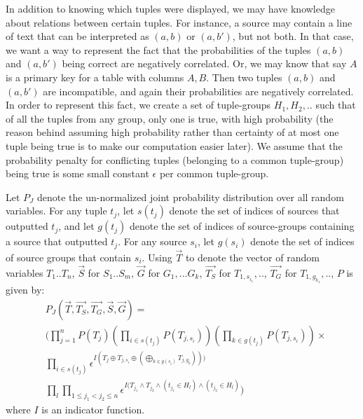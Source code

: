 \documentclass{sig-alternate}
\newcounter{prob}
\begin{document}
In addition to knowing which tuples were displayed, we may have knowledge about relations between certain tuples. For instance, a source may contain a line of text that can be interpreted as $(a,b)$ or $(a, b')$, but not both. In that case, we want a way to represent the fact that the probabilities of the tuples $(a, b)$ and $(a, b')$ being correct are negatively correlated. Or, we may know that say $A$ is a primary key for a table with columns $A,B$. Then two tuples $(a,b)$ and $(a,b')$ are incompatible, and again their probabilities are negatively correlated. In order to represent this fact, we create a set of tuple-groups $H_1, H_2, ..$ such that of all the tuples from any group, only one is true, with high probability (the reason behind assuming high probability rather than certainty of at most one tuple being true is to make our computation easier later). We assume that the probability penalty for conflicting tuples (belonging to a common tuple-group) being true is some small constant $\epsilon$ per common tuple-group. 

Let $P_J$ denote the un-normalized joint probability distribution over all random variables. For any tuple $t_j$, let $s(t_j)$ denote the set of indices of sources that outputted $t_j$, and let $g(t_j)$ denote the set of indices of source-groups containing a source that outputted $t_j$. For any source $s_i$, let $g(s_i)$ denote the set of indices of source groups that contain $s_i$. 
Using $\overrightarrow{T}$ to denote the vector of random variables $T_1..T_n$, $\overrightarrow{S}$ for $S_1..S_m$, $\overrightarrow{G}$ for $G_1, ... G_k$, $\overrightarrow{T_S}$ for $T_{1, s_{i_1}}, ..$, $\overrightarrow{T_G}$ for $T_{1, g_{k_1}}, ..$, $P$ is given by:
\begin{align*} 
& P_J(\overrightarrow{T}, \overrightarrow{T_S}, \overrightarrow{T_G}, \overrightarrow{S}, \overrightarrow{G}) =
\\& (\prod_{j=1}^{n} P(T_j) (\prod_{i\in s(t_j)} P(T_{j, s_i})) (\prod_{k\in g(t_j)} P(T_{j, s_i})) \times 
\\& \prod_{i\in s(t_j)} \epsilon^{I(T_j \oplus T_{j, s_i} \oplus(\bigoplus_{k\in g(s_i)} T_{j, g_k})))}
\\& \prod_{l} \prod_{1 \leq j_1 < j_2 \leq n} \epsilon^{I(T_{j_1} \land T_{j_2} \land (t_{j_1}\in H_l) \land (t_{j_2} \in H_l)})
\end{align*}
where $I$ is an indicator function.

\end{document}
